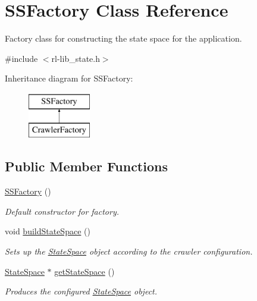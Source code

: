 \hypertarget{classSSFactory}{\section{S\-S\-Factory Class Reference}
\label{classSSFactory}
}


Factory class for constructing the state space for the application.  




{\ttfamily \#include $<$rl-\/lib\-\_\-state.\-h$>$}

Inheritance diagram for S\-S\-Factory\-:\begin{figure}[H]
\begin{center}
\leavevmode
\includegraphics[height=2.000000cm]{classSSFactory}
\end{center}
\end{figure}
\subsection*{Public Member Functions}
\begin{DoxyCompactItemize}
\item 
\hyperlink{classSSFactory_a0e0861527997db2577d4aaf0ae27f039}{S\-S\-Factory} ()
\begin{DoxyCompactList}\small\item\em Default constructor for factory. \end{DoxyCompactList}\item 
void \hyperlink{classSSFactory_a07a9ec582bed0309dcc980e5fedddea8}{build\-State\-Space} ()
\begin{DoxyCompactList}\small\item\em Sets up the \hyperlink{classStateSpace}{State\-Space} object according to the crawler configuration. \end{DoxyCompactList}\item 
\hyperlink{classStateSpace}{State\-Space} $\ast$ \hyperlink{classSSFactory_a8a612db62fec0377b4f65465f58b91df}{get\-State\-Space} ()
\begin{DoxyCompactList}\small\item\em Produces the configured \hyperlink{classStateSpace}{State\-Space} object. \end{DoxyCompactList}\end{DoxyCompactItemize}


